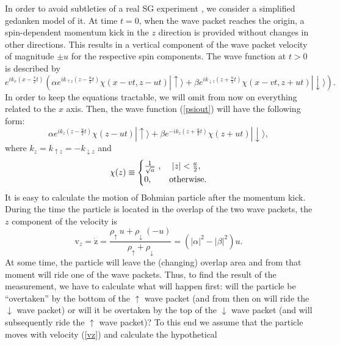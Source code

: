 \documentclass[preprint,tightenlines]{elsarticle}
\begin{document}
In order to avoid subtleties of a real SG experiment \cite{Home},
we consider a simplified gedanken model of it. At time $t=0$, when
the wave packet reaches the origin, a spin-dependent momentum kick
in the $z$ direction is provided without changes in other directions.
This results in a vertical component of the wave packet velocity of
magnitude $\pm u$ for the respective spin components. The wave function at $t>0$ is described by
\begin{equation}
e^{ik_{x}(x-\frac{v}{2}t)}\left(\alpha e^{ik_{\uparrow z}(z-\frac{u}{2}t)}\chi(x-vt,z-ut)|\uparrow\rangle+\beta e^{ik_{\downarrow z}(z+\frac{u}{2}t)}\chi(x-vt,z+ut)|\downarrow\rangle\right).\label{psiout}
\end{equation}
 In order to keep the equations tractable, we will omit from now on
everything related to the $x$ axis. Then, the wave function (\ref{psiout})
will have the following form:
 \begin{equation}
\alpha e^{ik_{z}(z-\frac{u}{2}t)}\chi(z-ut)|\uparrow\rangle+\beta e^{-ik_{z}(z+\frac{u}{2}t)}\chi(z+ut)|\downarrow\rangle,\label{psioutnox}
\end{equation}
 where $k_{z}=k_{\uparrow z}=-k_{\downarrow z}$ and
 \begin{equation}
\chi(z)\equiv\begin{cases}
\frac{1}{{\sqrt{a}}}~, & ~|z|<\frac{a}{2},\\
0, & {\rm otherwise}.\end{cases}\label{chi1}
\end{equation}
 It is easy to calculate the motion of Bohmian particle after the
momentum kick. During the time the particle is located in the overlap
of the two wave packets, the $z$ component of the velocity is
\begin{equation}
\mathrm{v}_{z}=\dot{\mathrm{z}}=\frac{{\rho_{\uparrow}~u+\rho_{\downarrow}~(-u)}}{{\rho_{\uparrow}+\rho_{\downarrow}}}=\left(|\alpha|^{2}-|\beta|^{2}\right)u.\label{vz}
\end{equation}
 At some time, the particle will leave the (changing) overlap area
and from that moment will ride one of the wave packets. Thus, to find
the result of the measurement, we have to calculate what will happen
first: will the particle be ``overtaken'' by the bottom of the
$\uparrow$ wave packet (and from then on will ride the $\downarrow$ wave packet)
or will it be overtaken by the top of the $\downarrow$ wave packet (and will
subsequently ride the $\uparrow$ wave packet)? To this end we assume that
the particle moves with velocity (\ref{vz}) and calculate the hypothetical
\end{document}
